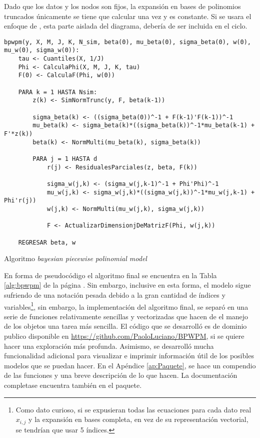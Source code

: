 \documentclass[../Main/Main.tex]{subfiles}
\begin{document}
Dado que los datos y los nodos son fijos, la expansión en bases de polinomios truncados únicamente se tiene que calcular una vez y es constante. Si se usara el enfoque de \autocite{mallik1998automatic}, esta parte aislada del diagrama, debería de ser incluida en el ciclo.

\begin{table}[h]
\makebox[\linewidth]{\rule{\textwidth}{0.4pt}}
\begin{verbatim}
bpwpm(y, X, M, J, K, N_sim, beta(0), mu_beta(0), sigma_beta(0), w(0), mu_w(0), sigma_w(0)):    
    tau <- Cuantiles(X, 1/J)
    Phi <- CalculaPhi(X, M, J, K, tau)
    F(0) <- CalculaF(Phi, w(0))
        
    PARA k = 1 HASTA Nsim:
        z(k) <- SimNormTrunc(y, F, beta(k-1))
            
        sigma_beta(k) <- ((sigma_beta(0))^-1 + F(k-1)'F(k-1))^-1
        mu_beta(k) <- sigma_beta(k)*((sigma_beta(k))^-1*mu_beta(k-1) + F'*z(k))
        beta(k) <- NormMulti(mu_beta(k), sigma_beta(k)) 
            
        PARA j = 1 HASTA d
            r(j) <- ResidualesParciales(z, beta, F(k))
                
            sigma_w(j,k) <- (sigma_w(j,k-1)^-1 + Phi'Phi)^-1
            mu_w(j,k) <- sigma_w(j,k)*((sigma_w(j,k))^-1*mu_w(j,k-1) + Phi'r(j))
            w(j,k) <- NormMulti(mu_w(j,k), sigma_w(j,k)) 
            
            F <- ActualizarDimensionjDeMatrizF(Phi, w(j,k))    
            
    REGRESAR beta, w
\end{verbatim} 
\makebox[\linewidth]{\rule{\textwidth}{0.4pt}}
\caption{Algoritmo \textit{bayesian piecewise polinomial model}}
\label{alg:bpwpm}
\end{table}

En forma de pseudocódigo el algoritmo final se encuentra en la Tabla \ref{alg:bpwpm} de la página \pageref{alg:bpwpm}. Sin embargo, inclusive en esta forma, el modelo sigue sufriendo de una notación pesada debido a la gran cantidad de índices y variables\footnote{Como dato curioso, si se expusieran todas las ecuaciones para cada dato real $x_{i,j}$ y la expansión en bases completa, en vez de su representación vectorial, se tendrían que usar 5 índices.}, sin embargo, la implementación del algoritmo final, se separó en una serie de funciones relativamente sencillas y vectorizadas que hacen de el manejo de los objetos una tarea más sencilla. El código que se desarrolló es de dominio publico disponible en \url{https://github.com/PaoloLuciano/BPWPM}, si se quiere hacer una exploración más profunda. Asimismo, se desarrolló mucha funcionalidad adicional para visualizar e imprimir información útil de los posibles modelos que se puedan hacer. En el Apéndice \ref{ap:Paquete}, se hace un compendio de las funciones y una breve descripción de lo que hacen. La documentación completase encuentra también en el paquete.
\end{document}
